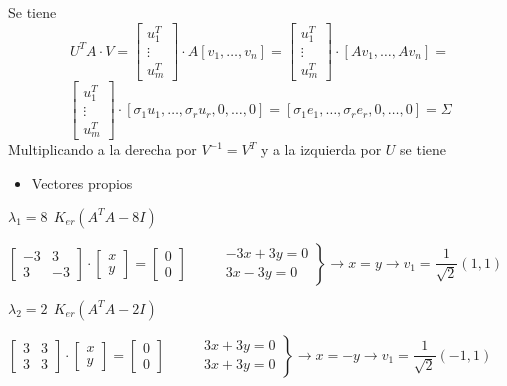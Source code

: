 \documentclass[12pt]{article}
\begin{document}
Se tiene \[U^TA\cdot V=\begin{bmatrix}
u_1^T\\
\vdots\\
u_m^T
\end{bmatrix}\cdot A[v_1,\hdots,v_n]=\begin{bmatrix}
u_1^T\\
\vdots\\
u_m^T
\end{bmatrix}\cdot[Av_1,\hdots,Av_n]= \]
\[\begin{bmatrix}
u_1^T\\
\vdots\\
u_m^T
\end{bmatrix}\cdot[\sigma_1 u_1,\hdots,\sigma_ru_r,0,\hdots,0]=[\sigma_1e_1,\hdots,\sigma_re_r,0,\hdots,0]=\Sigma\]
Multiplicando a la derecha por $V^{-1}=V^T$ y a la izquierda por $U$ se tiene \begin{center}
\end{center}
\begin{itemize}[label=\color{red}\textbullet, leftmargin=*]
    \item \color{lightblue}Vectores propios
\end{itemize}
$\lambda_1=8~~K_{er}(A^TA-8I)$

$\begin{bmatrix}
-3 & 3 \\ 
3 & -3
\end{bmatrix}\cdot\begin{bmatrix}
x\\
y
\end{bmatrix}=\begin{bmatrix}
0\\
0
\end{bmatrix}\hspace{1cm}\left.\begin{array}{r}
-3x+3y=0\\
3x-3y=0
\end{array}\right\rbrace\longrightarrow x=y\longrightarrow v_1=\dfrac{1}{\sqrt{2}}(1,1)$

$\lambda_2=2~~K_{er}(A^TA-2I)$

$\begin{bmatrix}
3 & 3 \\ 
3 & 3
\end{bmatrix}\cdot\begin{bmatrix}
x\\
y
\end{bmatrix}=\begin{bmatrix}
0\\
0
\end{bmatrix}\hspace{1cm}\left.\begin{array}{r}
3x+3y=0\\
3x+3y=0
\end{array}\right\rbrace\longrightarrow x=-y\longrightarrow v_1=\dfrac{1}{\sqrt{2}}(-1,1)$
\end{document}
